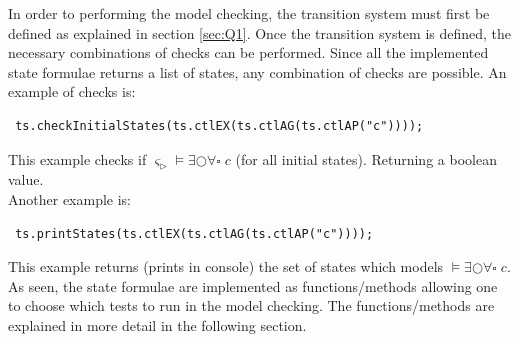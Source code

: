 In order to performing the model checking, the transition system must first be defined as explained in section \ref{sec:Q1}. Once the transition system is defined, the necessary combinations of checks can be performed. Since all the implemented state formulae returns a list of states, any combination of checks are possible. An example of checks is:
\begin{lstlisting}
 ts.checkInitialStates(ts.ctlEX(ts.ctlAG(ts.ctlAP("c"))));
\end{lstlisting}

This example checks if $\varsigma_{\triangleright} \models \exists \bigcirc \forall \square \; c$ (for all initial states). Returning a boolean value.\\

Another example is:

\begin{lstlisting}
 ts.printStates(ts.ctlEX(ts.ctlAG(ts.ctlAP("c"))));
\end{lstlisting}

This example returns (prints in console) the set of states which models $\models \exists \bigcirc \forall \square \; c$. \\

As seen, the state formulae are implemented as functions/methods allowing one to choose which tests to run in the model checking. The functions/methods are explained in more detail in the following section.